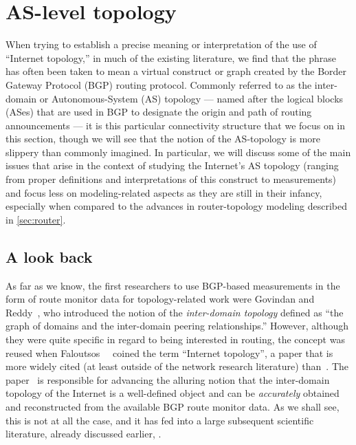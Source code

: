 \clearpage
\section{AS-level topology}
\label{sec:as}

When trying to establish a precise meaning or interpretation of the use of 
``Internet topology,'' in much of the existing literature, we find that the 
phrase has often been taken to mean a virtual construct or graph created by 
the Border Gateway Protocol (BGP) routing protocol.  Commonly referred to as 
the inter-domain or Autonomous-System (AS) topology --- named after the logical 
blocks (ASes) that are used in BGP to designate the origin and path of routing 
announcements --- it is this particular connectivity structure that we focus 
on in this section, though we will see that the notion of the AS-topology is 
more slippery than commonly imagined. In particular, we will discuss some of 
the main issues that arise in the context of studying the Internet's AS topology 
(ranging from proper definitions and interpretations of this construct to 
measurements) and focus less on modeling-related aspects as they are still in
their infancy, especially when compared to the advances in router-topology
modeling described in \autoref{sec:router}.


\subsection{A look back}
\label{sec:as_hist}

As far as we know, the first researchers to use BGP-based measurements
in the form of route monitor data for topology-related work were
Govindan and Reddy~\cite{govindan97:_topology}, who introduced the
notion of the {\em inter-domain topology} defined as ``the graph of
domains and the inter-domain peering relationships.''  However,
although they were quite specific in regard to being interested in
routing, the concept was reused when
Faloutsos~\etal~\cite{faloutsos99:_power_law_relat_of_inter_topol}
coined the term ``Internet topology'', a paper that is more widely
cited (at least outside of the network research literature)
than~\cite{govindan97:_topology}.  The
paper~\cite{faloutsos99:_power_law_relat_of_inter_topol} is
responsible for advancing the alluring notion that the inter-domain
topology of the Internet is a well-defined object and can be {\em
  accurately} obtained and reconstructed from the available BGP route
monitor data. As we shall see, this is not at all the case, and it has
fed into a large subsequent scientific literature, already discussed
earlier, \eg \cite{barabasi99,barabasi02}.

